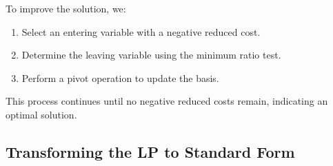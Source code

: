 To improve the solution, we:
\begin{enumerate}
    \item Select an entering variable with a negative reduced cost.
    \item Determine the leaving variable using the minimum ratio test.
    \item Perform a pivot operation to update the basis.
\end{enumerate}

This process continues until no negative reduced costs remain, indicating an optimal solution.

\subsection{Transforming the LP to Standard Form}

